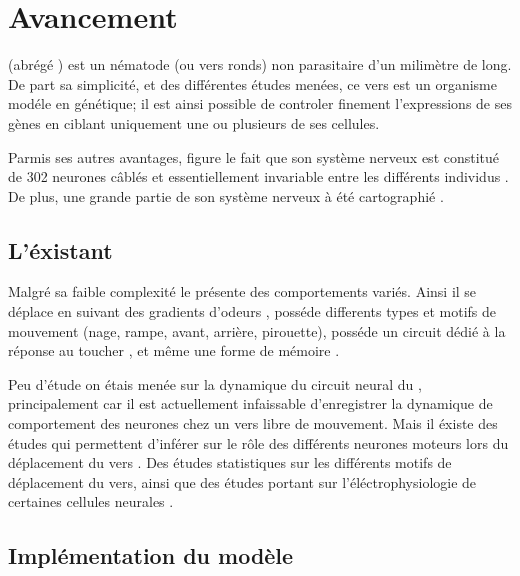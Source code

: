 \chapter{Avancement} %
\label{cha:Avancement}

\caeleg{} (abrégé \celeg{}) est un nématode (ou vers ronds) non parasitaire d'un milimètre de long.
De part sa simplicité, et des différentes études menées, ce vers est un organisme modéle en génétique;
il est ainsi possible de controler finement l'expressions de ses gènes en ciblant uniquement une ou
plusieurs de ses cellules.

Parmis ses autres avantages, figure le fait que son système nerveux est constitué de 302
neurones câblés et essentiellement invariable entre les différents individus \cite{Boyle2009}.
De plus, une grande partie de son système nerveux à été cartographié
\cite{Durbin1987,Gray2005,Boyle2009,Varshney2011}.

\section{L'éxistant} %
\label{sec:L'éxistant}

Malgré sa faible complexité le \celeg{} présente des comportements variés. Ainsi il se déplace
en suivant des gradients d'odeurs \cite{Ferree1999,Gray2005}, posséde differents types et
motifs de mouvement (nage, rampe, avant, arrière, pirouette), posséde un circuit dédié à la 
réponse au toucher \cite{Chalfie1985}, et même une forme de mémoire \cite{Rankin2005a}.

Peu d'étude on étais menée sur la dynamique du circuit neural du \celeg{}, principalement
car il est actuellement infaissable d'enregistrer la dynamique de comportement des neurones
chez un vers libre de mouvement.
Mais il éxiste des études qui permettent d'inférer sur le rôle des différents neurones moteurs
lors du déplacement du vers \cite{Yanik2006,Chronis2007,Leifer2011}.
Des études statistiques sur les différents motifs de déplacement \cite{Gray2005} du vers, ainsi que
des études portant sur l'éléctrophysiologie de certaines cellules neurales \cite{Mellem2008a,Lockery2009}.


\section{Implémentation du modèle} %
\label{sub:Implémentation du modèle}

